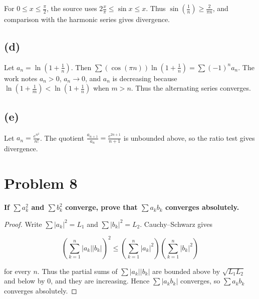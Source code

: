 For \(0 \leq x \leq \frac{\pi}{2}\), the source uses \(2\frac{x}{\pi} \leq \sin x \leq x\). Thus \(\sin\left( \frac{1}{n} \right) \geq \frac{2}{\pi n}\), and comparison with the harmonic series gives divergence.

\subsection{(d)}

Let \(a_{n} = \ln\left( {1 + \frac{1}{n}} \right)\). Then \(\sum\left( {\cos\left( {\pi n} \right)} \right)\ln\left( {1 + \frac{1}{n}} \right) = {\sum\left( {- 1} \right)}^{n}a_{n}\). The work notes \(a_{n} > 0\), \(a_{n}\rightarrow 0\), and \(a_{n}\) is decreasing because \(\ln\left( {1 + \frac{1}{m}} \right) < \ln\left( {1 + \frac{1}{n}} \right)\) when \(m > n\). Thus the alternating series converges.

\subsection{(e)}

Let \(a_{n} = \frac{e^{n^{2}}}{n!}\). The quotient \(\frac{a_{n + 1}}{a_{n}} = \frac{e^{2n + 1}}{n + 1}\) is unbounded above, so the ratio test gives divergence.

\section{Problem 8}

\textbf{If \(\sum a_{k}^{2}\) and \(\sum b_{k}^{2}\) converge, prove that \(\sum a_{k}b_{k}\) converges absolutely.}

\begin{proof}

Write \(\sum\left| a_{k} \right|^{2} = L_{1}\) and \(\sum\left| b_{k} \right|^{2} = L_{2}\). Cauchy--Schwarz gives

\[\left( {\sum\limits_{k = 1}^{n}\left| a_{k} \right|\left| b_{k} \right|} \right)^{2} \leq \left( {\sum\limits_{k = 1}^{n}\left| a_{k} \right|^{2}} \right)\left( {\sum\limits_{k = 1}^{n}\left| b_{k} \right|^{2}} \right)\]

for every \(n\). Thus the partial sums of \(\sum\left| a_{k} \right|\left| b_{k} \right|\) are bounded above by \(\sqrt{L_{1}L_{2}}\) and below by \(0\), and they are increasing. Hence \(\sum\left| {a_{k}b_{k}} \right|\) converges, so \(\sum a_{k}b_{k}\) converges absolutely.

\end{proof}

